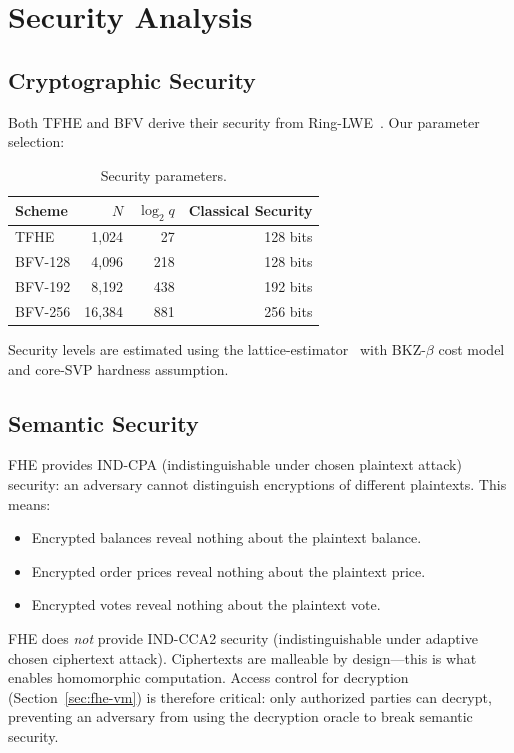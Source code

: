 \section{Security Analysis}

\label{sec:security}

\subsection{Cryptographic Security}

Both TFHE and BFV derive their security from Ring-LWE~\cite{lyubashevsky2010ideal}.
Our parameter selection:

\begin{table}[ht]
\centering
\caption{Security parameters.}
\label{tab:security-params}
\begin{tabular}{lrrr}
\toprule
\textbf{Scheme} & \textbf{$N$} & \textbf{$\log_2 q$} & \textbf{Classical Security} \\
\midrule
TFHE & 1{,}024 & 27 & 128 bits \\
BFV-128 & 4{,}096 & 218 & 128 bits \\
BFV-192 & 8{,}192 & 438 & 192 bits \\
BFV-256 & 16{,}384 & 881 & 256 bits \\
\bottomrule
\end{tabular}
\end{table}

Security levels are estimated using the lattice-estimator~\cite{albrecht2015lattice}
with BKZ-$\beta$ cost model and core-SVP hardness assumption.

\subsection{Semantic Security}

FHE provides IND-CPA (indistinguishable under chosen plaintext attack) security:
an adversary cannot distinguish encryptions of different plaintexts. This means:

\begin{itemize}[leftmargin=2em]
  \item Encrypted balances reveal nothing about the plaintext balance.
  \item Encrypted order prices reveal nothing about the plaintext price.
  \item Encrypted votes reveal nothing about the plaintext vote.
\end{itemize}

FHE does \emph{not} provide IND-CCA2 security (indistinguishable under adaptive
chosen ciphertext attack). Ciphertexts are malleable by design---this is what
enables homomorphic computation. Access control for decryption (Section~\ref{sec:fhe-vm})
is therefore critical: only authorized parties can decrypt, preventing an adversary
from using the decryption oracle to break semantic security.

